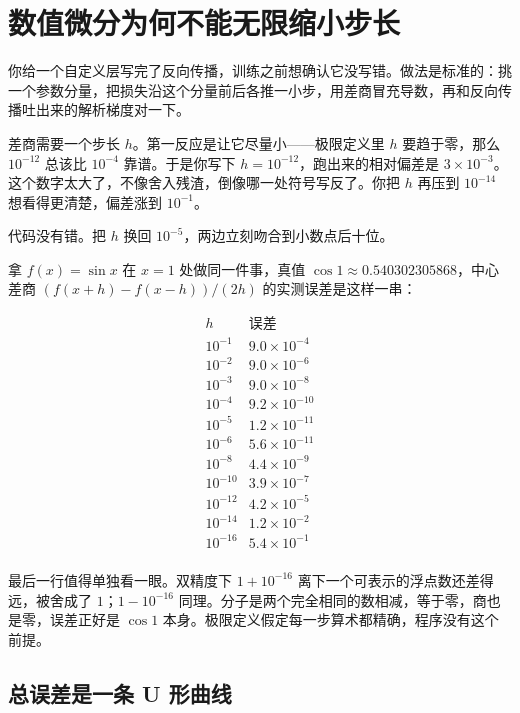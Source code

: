 \section{数值微分为何不能无限缩小步长}
\label{sec:08-Numerical-Analysis/04-Numerical-Differentiation-and-Integration/01}

你给一个自定义层写完了反向传播，训练之前想确认它没写错。做法是标准的：挑一个参数分量，把损失沿这个分量前后各推一小步，用差商冒充导数，再和反向传播吐出来的解析梯度对一下。

差商需要一个步长 \(h\)。第一反应是让它尽量小——极限定义里 \(h\) 要趋于零，那么 \(10^{-12}\) 总该比 \(10^{-4}\) 靠谱。于是你写下 \(h=10^{-12}\)，跑出来的相对偏差是 \(3\times10^{-3}\)。这个数字太大了，不像舍入残渣，倒像哪一处符号写反了。你把 \(h\) 再压到 \(10^{-14}\) 想看得更清楚，偏差涨到 \(10^{-1}\)。

代码没有错。把 \(h\) 换回 \(10^{-5}\)，两边立刻吻合到小数点后十位。

拿 \(f(x)=\sin x\) 在 \(x=1\) 处做同一件事，真值 \(\cos 1\approx0.540302305868\)，中心差商 \((f(x+h)-f(x-h))/(2h)\) 的实测误差是这样一串：

\[
\begin{array}{c|c}
h & \text{误差} \\
\hline
10^{-1} & 9.0\times10^{-4} \\
10^{-2} & 9.0\times10^{-6} \\
10^{-3} & 9.0\times10^{-8} \\
10^{-4} & 9.2\times10^{-10} \\
10^{-5} & 1.2\times10^{-11} \\
10^{-6} & 5.6\times10^{-11} \\
10^{-8} & 4.4\times10^{-9} \\
10^{-10} & 3.9\times10^{-7} \\
10^{-12} & 4.2\times10^{-5} \\
10^{-14} & 1.2\times10^{-2} \\
10^{-16} & 5.4\times10^{-1} \\
\end{array}
\]

最后一行值得单独看一眼。双精度下 \(1+10^{-16}\) 离下一个可表示的浮点数还差得远，被舍成了 \(1\)；\(1-10^{-16}\) 同理。分子是两个完全相同的数相减，等于零，商也是零，误差正好是 \(\cos 1\) 本身。极限定义假定每一步算术都精确，程序没有这个前提。

\subsection{总误差是一条 U 形曲线}

